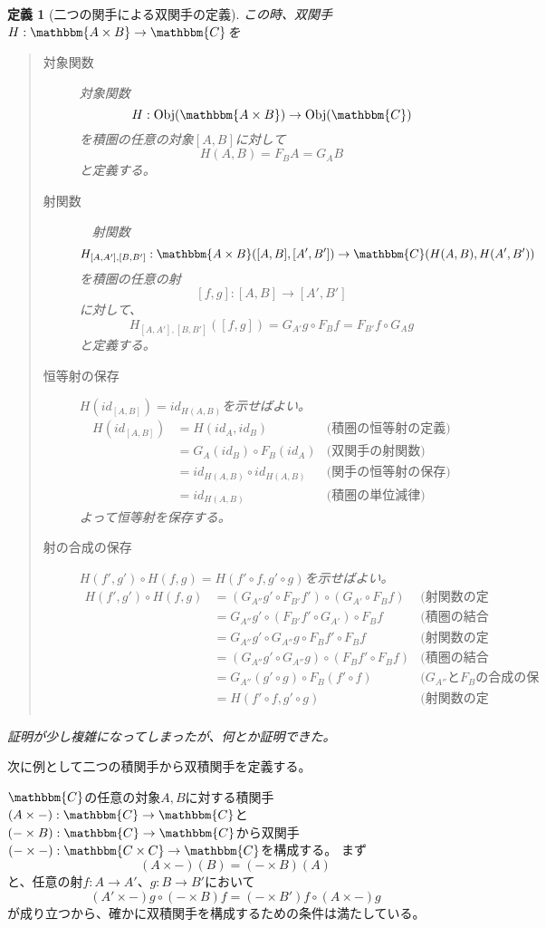 \documentclass[dvipdfmx]{jsarticle}
\newcommand{\cat}[1]{\mathbbm{#1}}
\newcommand{\arrow}{\rightarrow}
\newcommand{\functor}[3]{#1:\cat{#2}\arrow \cat{#3}}
\newcommand{\obj}[1]{\mathrm{Obj}(\cat{#1})}
\newcommand{\mor}[3]{#1:#2\arrow #3}
\newcommand{\arset}[3]{\cat{#1}(#2,#3)}
\newcommand{\pcobj}[1]{[#1]}
\newtheorem{define}{定義}[section]
\numberwithin{proof}{subsection}
\numberwithin{prop}{subsection}
\numberwithin{define}{subsection}
\begin{document}
\begin{define}[二つの関手による双関手の定義]
		この時、双関手$\functor{H}{A\times B}{C}$を
		\begin{quote}
			\begin{description}
				\item[対象関数] 対象関数\[\mor{H}{\obj{A\times B}}{\obj{C}}\]を積圏の任意の対象$\pcobj{A,B}$に対して
				\[H(A,B)={F_B}A={G_A}B\]と定義する。
				\item[射関数]　射関数\[\mor{H_{\pcobj{A,A'},\pcobj{B,B'}}}{\arset{A\times B}{\pcobj{A,B}}{\pcobj{A',B'}}}{\arset{C}{H(A,B)}{H(A',B')}}\]を積圏の任意の射\[\mor{\pcobj{f,g}}{\pcobj{A,B}}{\pcobj{A',B'}}\]に対して、\[H_{\pcobj{A,A'},\pcobj{B,B'}}(\pcobj{f,g})={G_{A'}}g\circ {F_B}f = {F_{B'}}f\circ {G_A}g\]と定義する。
				\item[恒等射の保存]$H(id_{\pcobj{A,B}})=id_{H(A,B)}$を示せばよい。
				\begin{align*}
					H(id_{\pcobj{A,B}})&=H(id_A,id_B)&\text{(積圏の恒等射の定義)}\\
					&=G_A(id_B)\circ F_B(id_A)&\text{(双関手の射関数)}\\
					&=id_{H(A,B)}\circ id_{H(A,B)}&\text{(関手の恒等射の保存)}\\
					&=id_{H(A,B)}&\text{(積圏の単位減律)}
				\end{align*}
				よって恒等射を保存する。
				\item[射の合成の保存]$H(f',g')\circ H(f,g)=H(f'\circ f,g'\circ g)$を示せばよい。
				\begin{align*}
					H(f',g')\circ H(f,g)&=(G_{A''}g'\circ F_{B'}f')\circ(G_{A'}\circ F_Bf)&\text{(射関数の定義)}\\
					&=G_{A''}g'\circ (F_{B'}f'\circ G_{A'})\circ  F_Bf&\text{(積圏の結合律)}\\
					&=G_{A''}g'\circ G_{A''}g\circ F_Bf'\circ  F_Bf&\text{(射関数の定義)}\\
					&=(G_{A''}g'\circ G_{A''}g)\circ (F_Bf'\circ  F_Bf)&\text{(積圏の結合則)}\\
					&=G_{A''}(g'\circ g)\circ F_B(f'\circ f)&\text{($G_{A''}$と$F_B$の合成の保存)}\\
					&=H(f'\circ f,g'\circ g)&\text{(射関数の定義)}\\
				\end{align*}
			\end{description}
		\end{quote}
		証明が少し複雑になってしまったが、何とか証明できた。
	\end{define}
	次に例として二つの積関手から双積関手を定義する。

	$\cat{C}$の任意の対象$A,B$に対する積関手$\functor{(A\times -)}{C}{C}$と$\functor{(-\times B)}{C}{C}$から双関手$\functor{(-\times -)}{C\times C}{C}$を構成する。
	まず\[(A\times -)(B)=(-\times B)(A)\]と、任意の射$\mor{f}{A}{A'}$、$\mor{g}{B}{B'}$において
	\[(A'\times -)g\circ (-\times B)f=(-\times B')f\circ(A\times -)g\]が成り立つから、確かに双積関手を構成するための条件は満たしている。
\end{document}
